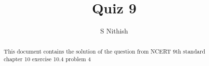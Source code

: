 \documentclass[journal,12pt,twocolumn]{IEEEtran}
\begin{document}
\let\StandardTheFigure\thefigure
\let\vec\mathbf
\renewcommand{\thefigure}{\theproblem}



\def\putbox#1#2#3{\makebox[0in][l]{\makebox[#1][l]{}\raisebox{\baselineskip}[0in][0in]{\raisebox{#2}[0in][0in]{#3}}}}
     \def\rightbox#1{\makebox[0in][r]{#1}}
     \def\centbox#1{\makebox[0in]{#1}}
     \def\topbox#1{\raisebox{-\baselineskip}[0in][0in]{#1}}
     \def\midbox#1{\raisebox{-0.5\baselineskip}[0in][0in]{#1}}

\vspace{3cm}


\title{Quiz 9}
\author{S Nithish}
\maketitle

\newpage


\bigskip

\renewcommand{\thefigure}{\theenumi}
\renewcommand{\thetable}{\theenumi}


\begin{abstract}
This document contains the solution of the question from NCERT 9th standard chapter 10 exercise 10.4 problem 4
\end{abstract}

%

%
%
\end{document}
